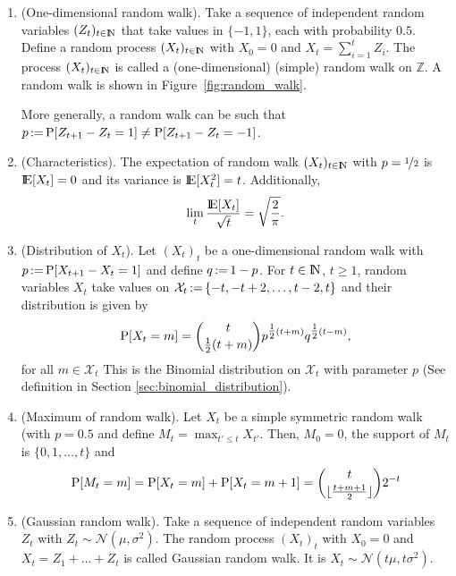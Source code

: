 \documentclass[a4paper,10pt]{scrbook}
\begin{document}
\begin{enumerate}
 \item (One-dimensional random walk). Take a sequence of independent random variables \((Z_{t})_{t\in\N}\) that take 
       values in \(\{-1, 1\}\), each with probability \(0.5\). Define a random process 
       \((X_t)_{t\in \N}\) with \(X_0=0\) and \(X_t = \sum_{i=1}^{t}Z_i\). The process \((X_t)_{t\in \N}\) is called
       a (one-dimensional) (simple) random walk on \(\mathbb{Z}\). A random walk is shown in Figure~\ref{fig:random_walk}.              
       
       More generally, a random walk can be such that \(p{}\mathop{\mathrel{:}=}{}\mathrm{P}[Z_{t+1} - Z_{t} = 1] \neq \mathrm{P}[Z_{t+1} - Z_{t} = -1]\).
       
 \item (Characteristics). The expectation of random walk \((X_t)_{t\in\N}\) with \(p=\nicefrac{1}{2}\) 
       is \(\E[X_t]=0\) and its variance is \(\E[X_t^2] = t\). Additionally,
       \[
        \lim_{t}\frac{\E[X_t]}{\sqrt{t}} = \sqrt{\frac{2}{\pi}}.
       \]
 \item (Distribution of \(X_t\)). Let \((X_t)_t\) be a one-dimensional random walk with 
       \(p{}\mathop{\mathrel{:}=}{} \mathrm{P}[X_{t+1} - X_{t} = 1]\) and define \(q {}\mathop{\mathrel{:}=}{} 1-p\). 
       For \(t\in\N\), \(t\geq 1\), random variables \(X_t\) take values on 
       \(\mathcal{X}_t {}\mathop{\mathrel{:}=}{} \{-t, -t+2, \ldots, t-2, t\}\) and their distribution is given by
       \[
        \mathrm{P}[X_t = m] = {t \choose \tfrac{1}{2}(t+m)} p^{\tfrac{1}{2}(t+m)} q^{\tfrac{1}{2}(t-m)},
       \]
       for all \(m \in \mathcal{X}_t\)
       This is the Binomial distribution on \(\mathcal{X}_t\) with parameter \(p\) 
       (See definition in Section \ref{sec:binomial_distribution}).
 \item (Maximum of random walk). Let \(X_t\) be a simple symmetric random walk (with \(p=0.5\)
       and define \(M_t = \max_{t'\leq t}X_{t'}\). Then, \(M_0=0\), the support of \(M_t\) is 
       \(\{0,1,\ldots, t\}\) and 
       \[
        \mathrm{P}[M_t = m] = \mathrm{P}[X_t = m] + \mathrm{P}[X_t = m+1] = {t \choose {\lfloor \tfrac{t+m+1}{2}\rfloor} }2^{-t}
       \]

 \item (Gaussian random walk). Take a sequence of independent random variables \(Z_{t}\) with \(Z_t\sim\mathcal{N}(\mu, \sigma^2)\).
       The random process \((X_t)_t\) with \(X_0=0\) and \(X_t = Z_1+\ldots+Z_t\) is called Gaussian random walk.
       It is \(X_t\sim \mathcal{N}(t\mu, t\sigma^2)\).
\end{enumerate}
\end{document}
